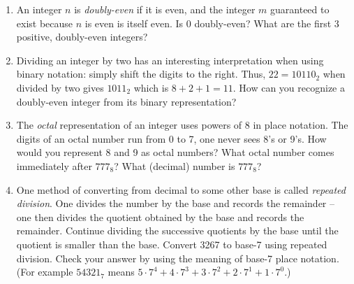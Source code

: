 \begin{enumerate}

\item An integer $n$ is  \emph{doubly-even} 
if it is even, and the integer $m$ guaranteed to exist because 
$n$ is even is itself even.  Is 0 doubly-even?  What are the 
first 3 positive, doubly-even integers?

\wbvfill


\item Dividing an integer by two has an interesting interpretation
when using binary notation: simply shift the digits to the right.
Thus, $22 = 10110_2$ when divided by two gives $1011_2$ which is
$8+2+1=11$.  How can you recognize a doubly-even integer from
its binary representation?

\wbvfill


\item The  \emph{octal} representation 
of an integer uses powers of 8 in place notation.  The digits of an 
octal number run from 0 to 7, one never sees 8's or 9's.  How would 
you represent 8 and 9 as octal numbers?  What octal number comes 
immediately after $777_8$?  What (decimal) number is $777_8$?

\wbvfill

\workbookpagebreak


\hintspagebreak

\item One method of converting from decimal to some other base is
called  \emph{repeated division}.  
One divides the number by the base
and records the remainder -- one then divides the quotient obtained
by the base and records the remainder.  Continue dividing the 
successive quotients by the base until the quotient is smaller than
the base.  Convert 3267 to base-7 using repeated division.  Check 
your answer by using the meaning of base-7 place notation.  (For
example $54321_7$ means $5\cdot7^4 + 4\cdot7^3 + 3 \cdot7^2 +
2\cdot7^1 + 1\cdot7^0$.)


\end{enumerate}

